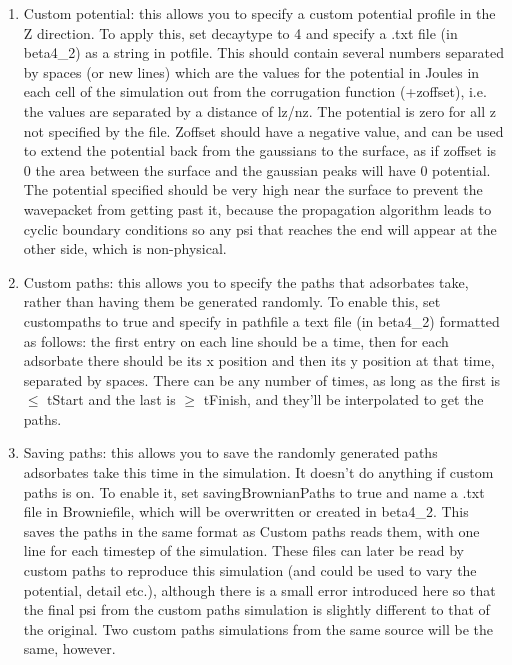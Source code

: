 \documentclass[11pt,letterpaper]{article}
\begin{document}
\begin{enumerate}
    \item Custom potential: this allows you to specify a custom potential profile in the Z direction. To apply this, set decaytype to 4 and specify a .txt file (in beta4\_2) as a string in potfile. This should contain several numbers separated by spaces (or new lines) which are the values for the potential in Joules in each cell of the simulation out from the corrugation function (+zoffset), i.e. the values are separated by a distance of lz/nz. The potential is zero for all z not specified by the file. Zoffset should have a negative value, and can be used to extend the potential back from the gaussians to the surface, as if zoffset is 0 the area between the surface and the gaussian peaks will have 0 potential. The potential specified should be very high near the surface to prevent the wavepacket from getting past it, because the propagation algorithm leads to cyclic boundary conditions so any psi that reaches the end will appear at the other side, which is non-physical.
    \item Custom paths: this allows you to specify the paths that adsorbates take, rather than having them be generated randomly. To enable this, set custompaths to true and specify in pathfile a text file (in beta4\_2) formatted as follows: the first entry on each line should be a time, then for each adsorbate there should be its x position and then its y position at that time, separated by spaces. There can be any number of times, as long as the first is $\leq$ tStart and the last is $\geq$ tFinish, and they’ll be interpolated to get the paths. 
    \item Saving paths: this allows you to save the randomly generated paths adsorbates take this time in the simulation. It doesn’t do anything if custom paths is on. To enable it, set savingBrownianPaths to true and name a .txt file in Browniefile, which will be overwritten or created in beta4\_2. This saves the paths in the same format as Custom paths reads them, with one line for each timestep of the simulation. These files can later be read by custom paths to reproduce this simulation (and could be used to vary the potential, detail etc.), although there is a small error introduced here so that the final psi from the custom paths simulation is slightly different to that of the original. Two custom paths simulations from the same source will be the same, however.
\end{enumerate}
\end{document}
